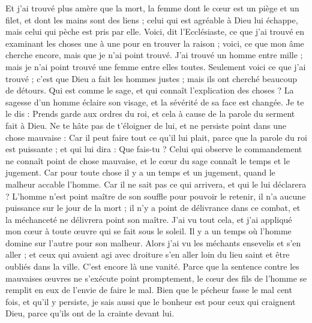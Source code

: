 \begin{multicols}{2}
Et j'ai trouvé plus amère que la mort, la femme dont le cœur est un piège et un filet, et dont les mains sont des liens ; celui qui est agréable à Dieu lui échappe, mais celui qui pèche est pris par elle.
Voici, dit l'Ecclésiaste, ce que j'ai trouvé en examinant les choses une à une pour en trouver la raison ;
voici, ce que mon âme cherche encore, mais que je n'ai point trouvé. J'ai trouvé un homme entre mille ; mais je n’ai point trouvé une femme entre elles toutes.
Seulement voici ce que j'ai trouvé ; c'est que Dieu a fait les hommes justes ; mais ils ont cherché beaucoup de détours.
\VerseOne{}Qui est comme le sage, et qui connaît l’explication des choses ? La sagesse d’un homme éclaire son visage, et la sévérité de sa face est changée.
Je te le dis : Prends garde aux ordres du roi, et cela à cause de la parole du serment fait à Dieu.
Ne te hâte pas de t’éloigner de lui, et ne persiste point dans une chose mauvaise : Car il peut faire tout ce qu'il lui plait,
parce que la parole du roi est puissante ; et qui lui dira : Que fais-tu ?
Celui qui observe le commandement ne connaît point de chose mauvaise, et le cœur du sage connaît le temps et le jugement.
Car pour toute chose il y a un temps et un jugement, quand le malheur accable l'homme.
Car il ne sait pas ce qui arrivera, et qui le lui déclarera ?
L'homme n'est point maître de son souffle pour pouvoir le retenir, il n'a aucune puissance sur le jour de la mort ; il n'y a point de délivrance dans ce combat, et la méchanceté ne délivrera point son maître.
J'ai vu tout cela, et j'ai appliqué mon cœur à toute œuvre qui se fait sous le soleil. Il y a un temps où l’homme domine sur l'autre pour son malheur.
Alors j'ai vu les méchants ensevelis et s’en aller ; et ceux qui avaient agi avec droiture s’en aller loin du lieu saint et être oubliés dans la ville. C’est encore là une vanité.
Parce que la sentence contre les mauvaises œuvres ne s'exécute point promptement, le cœur des fils de l’homme se remplit en eux de l’envie de faire le mal.
Bien que le pécheur fasse le mal cent fois, et qu’il y persiste, je sais aussi que le bonheur est pour ceux qui craignent Dieu, parce qu’ils ont de la crainte devant lui.

\end{multicols}
